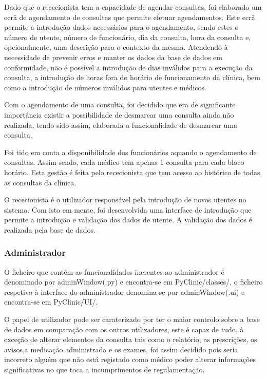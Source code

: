 \documentclass[11pt,a4paper,twoside]{report}
\begin{document}
	Dado que o rececionista tem a capacidade de agendar consultas, foi elaborado um ecrã de agendamento de consultas que permite efetuar agendamentos. Este ecrã permite a introdução dados necessários para o agendamento, sendo estes o número de utente, número de funcionário, dia da consulta, hora da consulta e, opcionalmente, uma descrição para o contexto da mesma. Atendendo à necessidade de prevenir erros e manter os dados da base de dados em conformidade, não é possível a introdução de dias inválidos para a execução da consulta, a introdução de horas fora do horário de funcionamento da clínica, bem como a introdução de números inválidos para utentes e médicos.
	
	Com o agendamento de uma consulta, foi decidido que era de significante importância existir a possibilidade de desmarcar uma consulta ainda não realizada, tendo sido assim, elaborada a funcionalidade de desmarcar uma consulta.
	
	Foi tido em conta a disponibilidade dos funcionários aquando o agendamento de consultas. Assim sendo, cada médico tem apenas 1 consulta para cada bloco horário. Esta gestão é feita pelo rececionista que tem acesso ao histórico de todas as consultas da clínica.
	
	O rececionista é o utilizador responsável pela introdução de novos utentes no sistema. Com isto em mente, foi desenvolvida uma interface de introdução que permite a introdução e validação dos dados de utente. A validação dos dados é realizada pela base de dados.
	
	\subsubsection{Administrador}
	
	O ficheiro que contém as funcionalidades inerentes ao administrador é denominado por adminWindow(.py) e encontra-se em PyClinic/classes/, o ficheiro respetivo à interface do administrador denomina-se por adminWindow(.ui) e encontra-se em PyClinic/UI/.
	
	O papel de utilizador pode ser caraterizado por ter o maior controlo sobre a base de dados em comparação com os outros utilizadores, este é capaz de tudo, à exceção de alterar elementos da consulta tais como o relatório, as prescrições, os avisos,a medicação administrada e os exames, foi assim decidido pois seria incorreto alguém que não está registado como médico poder alterar informações significativas no que toca a incumprimentos de regulamentação.
	
\end{document}

